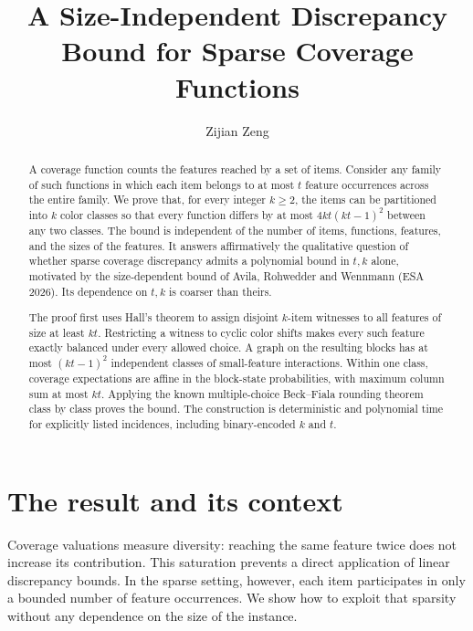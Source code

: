 \documentclass[acmsmall,11pt,nonacm]{acmart}
\title{A Size-Independent Discrepancy Bound for Sparse Coverage Functions}
\author{Zijian Zeng}
\affiliation{\institution{UCSI University}\city{}\country{Malaysia}}
\begin{document}
\begin{abstract}
\normalsize
A coverage function counts the features reached by a set of items. Consider
any family of such functions in which each item belongs to at most $t$
feature occurrences across the entire family. We prove that, for every
integer $k\ge 2$, the items can be partitioned into $k$ color classes so
that every function differs by at most $4kt(kt-1)^2$ between any two
classes. The bound is independent of the number of items, functions,
features, and the sizes of the features. It answers affirmatively the
qualitative question of whether sparse coverage discrepancy admits a
polynomial bound in $t,k$ alone, motivated by the size-dependent bound of
Avila, Rohwedder and Wennmann (ESA 2026). Its dependence on $t,k$ is coarser
than theirs.

The proof first uses Hall's theorem to assign disjoint $k$-item witnesses
to all features of size at least $kt$. Restricting a witness to cyclic
color shifts makes every such feature exactly balanced under every allowed
choice. A graph on the resulting blocks has at most $(kt-1)^2$ independent
classes of small-feature interactions. Within one class, coverage
expectations are affine in the block-state probabilities, with maximum
column sum at most $kt$. Applying the known multiple-choice Beck--Fiala
rounding theorem class by class proves the bound. The construction is
deterministic and polynomial time for explicitly listed incidences,
including binary-encoded $k$ and $t$.
\end{abstract}
\maketitle
\thispagestyle{plain}
\pagestyle{plain}
\clearpage

\section{The result and its context}
\label{sec:intro}

Coverage valuations measure diversity: reaching the same feature twice
does not increase its contribution. This saturation prevents a direct
application of linear discrepancy bounds. In the sparse setting, however,
each item participates in only a bounded number of feature occurrences.
We show how to exploit that sparsity without any dependence on the size
of the instance.
\end{document}
